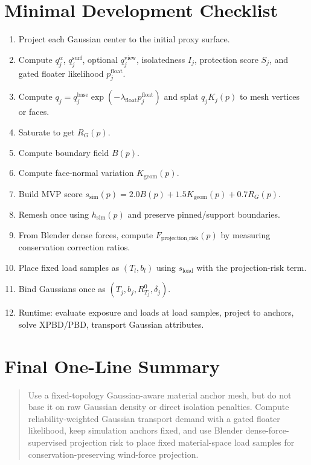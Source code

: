 \documentclass[11pt,a4paper]{article}
\begin{document}
\section{Minimal Development Checklist}

\begin{enumerate}[leftmargin=2em]
\item Project each Gaussian center to the initial proxy surface.
\item Compute $q_j^\alpha$, $q_j^{\mathrm{surf}}$, optional $q_j^{\mathrm{view}}$, isolatedness $I_j$, protection score $S_j$, and gated floater likelihood $p_j^{\mathrm{float}}$.
\item Compute $q_j=q_j^{\mathrm{base}}\exp(-\lambda_{\mathrm{float}}p_j^{\mathrm{float}})$ and splat $q_jK_j(p)$ to mesh vertices or faces.
\item Saturate to get $R_G(p)$.
\item Compute boundary field $B(p)$.
\item Compute face-normal variation $K_{\mathrm{geom}}(p)$.
\item Build MVP score $s_{\mathrm{sim}}(p)=2.0B(p)+1.5K_{\mathrm{geom}}(p)+0.7R_G(p)$.
\item Remesh once using $h_{\mathrm{sim}}(p)$ and preserve pinned/support boundaries.
\item From Blender dense forces, compute $F_{\mathrm{projection\_risk}}(p)$ by measuring conservation correction ratios.
\item Place fixed load samples as $(T_l,b_l)$ using $s_{\mathrm{load}}$ with the projection-risk term.
\item Bind Gaussians once as $(T_j,b_j,R_{T_j}^0,\delta_j)$.
\item Runtime: evaluate exposure and loads at load samples, project to anchors, solve XPBD/PBD, transport Gaussian attributes.
\end{enumerate}

\section{Final One-Line Summary}

\begin{quote}
Use a fixed-topology Gaussian-aware material anchor mesh, but do not base it on raw Gaussian density or direct isolation penalties. Compute reliability-weighted Gaussian transport demand with a gated floater likelihood, keep simulation anchors fixed, and use Blender dense-force-supervised projection risk to place fixed material-space load samples for conservation-preserving wind-force projection.
\end{quote}
\end{document}
